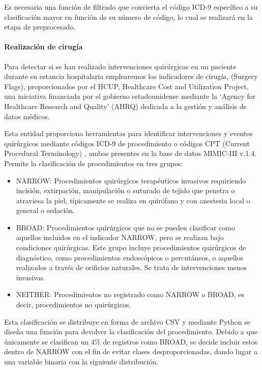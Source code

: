 \documentclass{report}
\begin{document}
Es necesaria una función de filtrado que convierta el código ICD-9
específico a su clasificación mayor en función de su número de código,
lo cual se realizará en la etapa de preprocesado.

\paragraph{Realización de cirugía}

Para detectar si se han realizado intervenciones quirúrgicas en un
paciente durante su estancia hospitalaria emplearemos los indicadores de
cirugía, (Surgery Flags), proporcionados por el HCUP, Healthcare Cost
and Utilization Project, una iniciativa financiada por el gobierno
estadounidense mediante la `Agency for Healthcare Research and Quality'
(AHRQ) dedicada a la gestión y análisis de datos médicos.

Esta entidad proporciona herramientas para identificar intervenciones y
eventos quirúrgicos mediante códigos ICD-9 de procedimiento o códigos CPT
(Current Procedural Terminology) , ambos presentes en la base de datos
MIMIC-III v.1.4.
Permite la clasificación de procedimientos en tres grupos:

\begin{itemize}
\item
  NARROW: Procedimientos quirúrgicos terapéuticos invasivos requiriendo
  incisión, extirpación, manipulación o suturado de tejido que penetra o
  atraviesa la piel, típicamente se realiza en quirófano y con anestesia
  local o general o sedación.
\item
  BROAD: Procedimientos quirúrgicos que no se pueden clasificar como
  aquellos incluidos en el indicador NARROW, pero se realizan bajo
  condiciones quirúrgicas. Este grupo incluye procedimientos quirúrgicos
  de diagnóstico, como procedimientos endoscópicos o percutáneos, o
  aquellos realizados a través de orificios naturales. Se trata de
  intervenciones menos invasivas.
\item
  NEITHER: Procedimientos no registrado como NARROW o BROAD, es decir,
  procedimientos no quirúrgicos. 
\end{itemize}

Esta clasificación se distribuye en forma de archivo CSV y mediante
Python se diseña una función para devolver la clasificación del
procedimiento.
Debido a que únicamente se clasifican un 4\% de registros como BROAD, se
decide incluir estos dentro de NARROW con el fin de evitar clases
desproporcionadas, dando lugar a una variable binaria con la siguiente
distribución.
\end{document}
